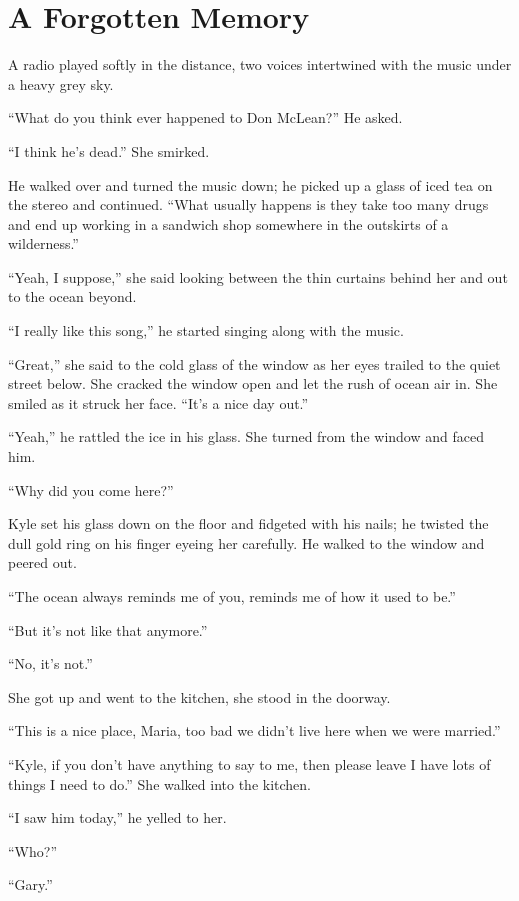 \chapter{A Forgotten Memory}\label{a-forgotten-memory}

A radio played softly in the distance, two voices intertwined with the
music under a heavy grey sky.

``What do you think ever happened to Don McLean?'' He asked.

``I think he's dead.'' She smirked.

He walked over and turned the music down; he picked up a glass of iced
tea on the stereo and continued. ``What usually happens is they take too
many drugs and end up working in a sandwich shop somewhere in the
outskirts of a wilderness.''

``Yeah, I suppose,'' she said looking between the thin curtains behind
her and out to the ocean beyond.

``I really like this song,'' he started singing along with the music.

``Great,'' she said to the cold glass of the window as her eyes trailed
to the quiet street below. She cracked the window open and let the rush
of ocean air in. She smiled as it struck her face. ``It's a nice day
out.''

``Yeah,'' he rattled the ice in his glass. She turned from the window
and faced him.

``Why did you come here?''

Kyle set his glass down on the floor and fidgeted with his nails; he
twisted the dull gold ring on his finger eyeing her carefully. He walked
to the window and peered out.

``The ocean always reminds me of you, reminds me of how it used to be.''

``But it's not like that anymore.''

``No, it's not.''

She got up and went to the kitchen, she stood in the doorway.

``This is a nice place, Maria, too bad we didn't live here when we were
married.''

``Kyle, if you don't have anything to say to me, then please leave I
have lots of things I need to do.'' She walked into the kitchen.

``I saw him today,'' he yelled to her.

``Who?''

``Gary.''

